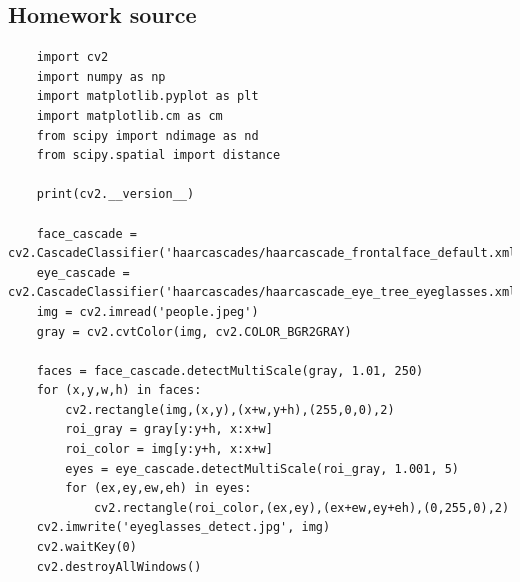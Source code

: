 \documentclass{article}
\begin{document}
\subsection{Homework source}
\begin{verbatim}
    import cv2
    import numpy as np
    import matplotlib.pyplot as plt
    import matplotlib.cm as cm
    from scipy import ndimage as nd
    from scipy.spatial import distance

    print(cv2.__version__)

    face_cascade = cv2.CascadeClassifier('haarcascades/haarcascade_frontalface_default.xml')
    eye_cascade = cv2.CascadeClassifier('haarcascades/haarcascade_eye_tree_eyeglasses.xml')
    img = cv2.imread('people.jpeg')
    gray = cv2.cvtColor(img, cv2.COLOR_BGR2GRAY)

    faces = face_cascade.detectMultiScale(gray, 1.01, 250)
    for (x,y,w,h) in faces:
        cv2.rectangle(img,(x,y),(x+w,y+h),(255,0,0),2)
        roi_gray = gray[y:y+h, x:x+w]
        roi_color = img[y:y+h, x:x+w]
        eyes = eye_cascade.detectMultiScale(roi_gray, 1.001, 5)
        for (ex,ey,ew,eh) in eyes:
            cv2.rectangle(roi_color,(ex,ey),(ex+ew,ey+eh),(0,255,0),2)
    cv2.imwrite('eyeglasses_detect.jpg', img)
    cv2.waitKey(0)
    cv2.destroyAllWindows()
\end{verbatim}
\end{document}
